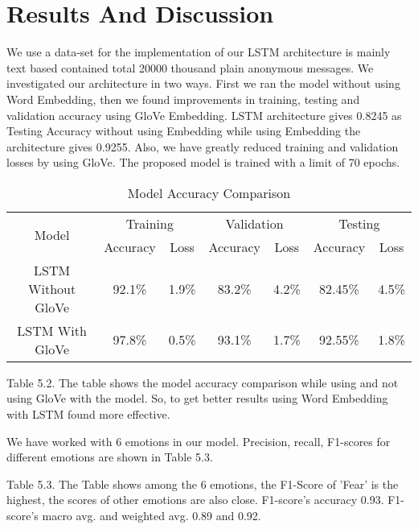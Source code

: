 \section{Results And Discussion}
We use a data-set for the implementation of our LSTM architecture is mainly text based contained total 20000 thousand plain anonymous messages. We investigated our architecture in two ways. First we ran the model without using Word Embedding, then we found improvements in training, testing and validation accuracy using GloVe Embedding. LSTM architecture gives 0.8245 as Testing Accuracy without using Embedding while using Embedding the architecture gives 0.9255. Also, we have greatly reduced training and validation losses by using GloVe. The proposed model is trained with a limit of 70 epochs.

\begin{table}[h!]
\centering
\begin{tabular}{|c|cc|cc|cc|}
\hline
\multirow{2}{*}{Model} & \multicolumn{2}{c|}{Training}         & \multicolumn{2}{c|}{Validation}       & \multicolumn{2}{c|}{Testing}          \\ \cline{2-7} 
                       & \multicolumn{1}{c|}{Accuracy} & Loss  & \multicolumn{1}{c|}{Accuracy} & Loss  & \multicolumn{1}{c|}{Accuracy} & Loss  \\ \hline
LSTM Without GloVe     & \multicolumn{1}{c|}{92.1\%}   & 1.9\% & \multicolumn{1}{c|}{83.2\%}   & 4.2\% & \multicolumn{1}{c|}{82.45\%}  & 4.5\% \\ \hline
LSTM With GloVe        & \multicolumn{1}{c|}{97.8\%}   & 0.5\% & \multicolumn{1}{c|}{93.1\%}   & 1.7\% & \multicolumn{1}{c|}{92.55\%}  & 1.8\% \\ \hline
\end{tabular}
\caption{Model Accuracy Comparison}
\end{table}

Table 5.2. The table shows the model accuracy comparison while using and not using GloVe with the model. So, to get better results using Word Embedding with LSTM found more effective.

We have worked with 6 emotions in our model. Precision, recall, F1-scores for different emotions are shown in Table 5.3.

Table 5.3. The Table shows among the 6 emotions,  the F1-Score of 'Fear' is the highest, the scores of other emotions are also close. F1-score's accuracy 0.93. F1-score's macro avg. and weighted avg. 0.89 and 0.92.
\pagebreak

